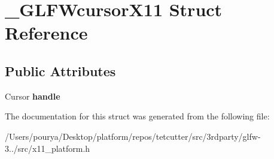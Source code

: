 \hypertarget{struct__GLFWcursorX11}{}\section{\+\_\+\+G\+L\+F\+Wcursor\+X11 Struct Reference}
\label{struct__GLFWcursorX11}
\subsection*{Public Attributes}
\begin{DoxyCompactItemize}
\item 
\hypertarget{struct__GLFWcursorX11_aa33b3a24b7e0169fc1d9ac9f5c07b6c2}{}Cursor {\bfseries handle}\label{struct__GLFWcursorX11_aa33b3a24b7e0169fc1d9ac9f5c07b6c2}

\end{DoxyCompactItemize}


The documentation for this struct was generated from the following file\+:\begin{DoxyCompactItemize}
\item 
/\+Users/pourya/\+Desktop/platform/repos/tetcutter/src/3rdparty/glfw-\/3../src/x11\+\_\+platform.\+h\end{DoxyCompactItemize}

